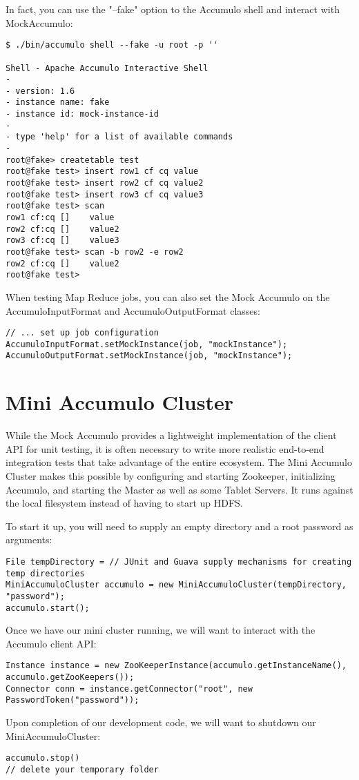 In fact, you can use the "--fake" option to the Accumulo shell and interact with
MockAccumulo:

\small
\begin{verbatim}
$ ./bin/accumulo shell --fake -u root -p ''

Shell - Apache Accumulo Interactive Shell
-
- version: 1.6
- instance name: fake
- instance id: mock-instance-id
-
- type 'help' for a list of available commands
-
root@fake> createtable test
root@fake test> insert row1 cf cq value
root@fake test> insert row2 cf cq value2
root@fake test> insert row3 cf cq value3
root@fake test> scan
row1 cf:cq []    value
row2 cf:cq []    value2
row3 cf:cq []    value3
root@fake test> scan -b row2 -e row2
row2 cf:cq []    value2
root@fake test>
\end{verbatim}
\normalsize

When testing Map Reduce jobs, you can also set the Mock Accumulo on the AccumuloInputFormat
and AccumuloOutputFormat classes:

\small
\begin{verbatim}
// ... set up job configuration
AccumuloInputFormat.setMockInstance(job, "mockInstance");
AccumuloOutputFormat.setMockInstance(job, "mockInstance");
\end{verbatim}
\normalsize

\section{Mini Accumulo Cluster}

While the Mock Accumulo provides a lightweight implementation of the client API for unit
testing, it is often necessary to write more realistic end-to-end integration tests that
take advantage of the entire ecosystem. The Mini Accumulo Cluster makes this possible by
configuring and starting Zookeeper, initializing Accumulo, and starting the Master as well
as some Tablet Servers. It runs against the local filesystem instead of having to start
up HDFS.

To start it up, you will need to supply an empty directory and a root password as arguments:

\small
\begin{verbatim}
File tempDirectory = // JUnit and Guava supply mechanisms for creating temp directories
MiniAccumuloCluster accumulo = new MiniAccumuloCluster(tempDirectory, "password");
accumulo.start();
\end{verbatim}
\normalsize

Once we have our mini cluster running, we will want to interact with the Accumulo client API:

\small
\begin{verbatim}
Instance instance = new ZooKeeperInstance(accumulo.getInstanceName(), accumulo.getZooKeepers());
Connector conn = instance.getConnector("root", new PasswordToken("password"));
\end{verbatim}
\normalsize

Upon completion of our development code, we will want to shutdown our MiniAccumuloCluster:

\small
\begin{verbatim}
accumulo.stop()
// delete your temporary folder
\end{verbatim}
\normalsize

